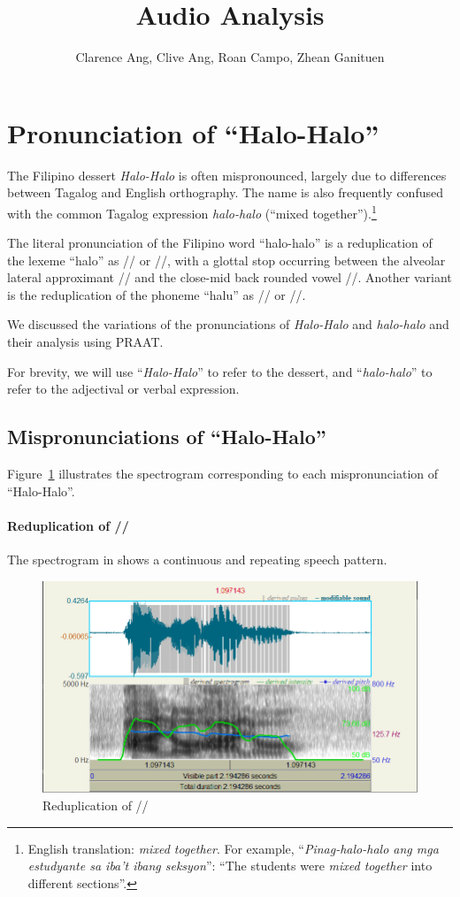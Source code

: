 \documentclass{article}
\title{Audio Analysis}
\author{   
	Clarence Ang,
	Clive Ang,
	Roan Campo,
	Zhean Ganituen
}
\begin{document}
	\maketitle
	
	\section{Pronunciation of ``Halo-Halo''}
	
	The Filipino dessert \emph{Halo-Halo} is often mispronounced, largely due to
	differences between Tagalog and English orthography. The name is also
	frequently confused with the common Tagalog expression \emph{halo-halo}
	(``mixed together'').\footnote{English translation: \emph{mixed together}. For
		example, ``\emph{Pinag-halo-halo ang mga estudyante sa iba't ibang seksyon}'':
		``The students were \emph{mixed together} into different sections''.}
	
	The literal pronunciation of the Filipino word ``halo-halo'' is a reduplication
	of the lexeme ``halo'' as // or //, with a glottal
	stop occurring between the alveolar lateral approximant // and the
	close-mid back rounded vowel //. Another variant is the
	reduplication of the phoneme ``halu'' as // or //.
	
	We discussed the variations of the pronunciations of \emph{Halo-Halo} and
	\emph{halo-halo} and their analysis using PRAAT.
	
	For brevity, we will use ``\emph{Halo-Halo}'' to refer to the dessert, and
	``\emph{halo-halo}'' to refer to the adjectival or verbal expression.
	
	\subsection{Mispronunciations of ``Halo-Halo''}
	
	Figure~\ref{fig:halo} illustrates the spectrogram corresponding to each
	mispronunciation of ``Halo-Halo''.
	
	\paragraph{Reduplication of //} The spectrogram in
	 shows a continuous and repeating speech pattern.
	
	\begin{figure}
		\centering
		\includegraphics[width=0.65\linewidth]{img/halo.png}
		\caption{Reduplication of //}\label{fig:halo}
	\end{figure}
	
\end{document}
